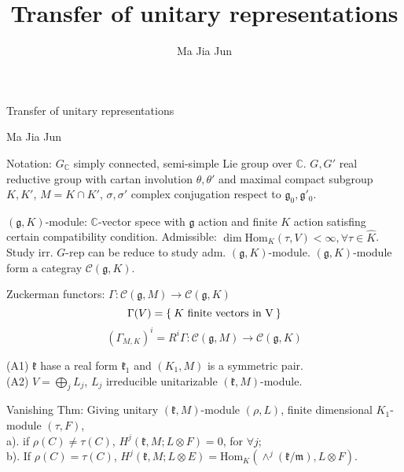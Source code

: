 \documentclass{beamer}
\title{Transfer of unitary representations}
\author{Ma Jia Jun}
\begin{document}
 \color{white}

\def\gg{{\mathfrak{g}}}
\def\kk{{\mathfrak{k}}}
\def\pp{{\mathfrak{p}}}
\def\qq{{\mathfrak{q}}}
\def\oo{{\mathfrak{o}}}
\def\mm{{\mathfrak{m}}}
\def\bC{{\mathbb{C}}}
\def\bR{{\mathbb{R}}}
\def\hK{{\widehat{K}}}
\def\cC{{\mathcal{C}}}
\def\Hom{\mathrm{Hom}}
\def\inn#1#2{\left\langle{#1},{#2}\right\rangle}
\def\innc#1#2{\left({#1},{#2}\right)}

\def\tt#1{{\color{yellow}#1}}
\begin{frame}[t]
\begin{center} 
\large Transfer of unitary representations
\end{center}
\begin{center}
 Ma Jia Jun
\end{center}
\end{frame}

\begin{frame}[t]
\tt{Notation:} $G_\bC$ simply connected, semi-simple Lie group over $\bC$.
$G,G'$ real reductive group with cartan involution 
$\theta,\theta'$ and maximal compact subgroup
$K,K'$, $M=K\cap K'$,
$\sigma,\sigma'$ complex conjugation respect to $\gg_0, \gg'_0$.
\end{frame}

\begin{frame}[t] \tt{$(\gg,K)$-module:} $\bC$-vector spece with $\gg$ action and finite $K$ action
satisfing certain compatibility condition. Admissible:
$\dim \Hom_K(\tau,V) < \infty, \forall \tau\in \hK$. 
Study irr. $G$-rep can be reduce to study adm. 
$(\gg,K)$-module. $(\gg,K)$-module form a categray $\cC(\gg,K)$.
\end{frame}

\begin{frame}[t]
\tt{Zuckerman functors:} $\Gamma:\cC(\gg,M)\to \cC(\gg,K)$ 
\[
\Gamma(V) = \Set{K\text{ finite vectors in V}}
\]
\[
(\Gamma_{M,K})^i=R^i\Gamma: \cC(\gg,M)\to \cC(\gg,K)
\]
\end{frame}

\begin{frame}[t]
(A1) $\kk$ hase a real form $\kk_1$ and $(K_1,M)$ is a symmetric pair.\\
(A2) $V = \bigoplus_j L_j$, $L_j$ irreducible unitarizable $(\kk,M)$-module.
\end{frame}

\begin{frame}[t]
\tt{Vanishing Thm:} 
Giving unitary $(\kk,M)$-module $(\rho,L)$, finite dimensional $K_1$-module 
$(\tau,F)$,\\
a). if $\rho(C) \neq \tau(C)$, 
  $H^j(\kk,M; L\otimes F)=0$, for $\forall j$;\\
b). If $\rho(C) = \tau(C)$, 
  $H^j(\kk,M; L\otimes E) =\Hom_K(\wedge^j(\kk/\mm),L\otimes F)$.
\end{frame}
\end{document}
